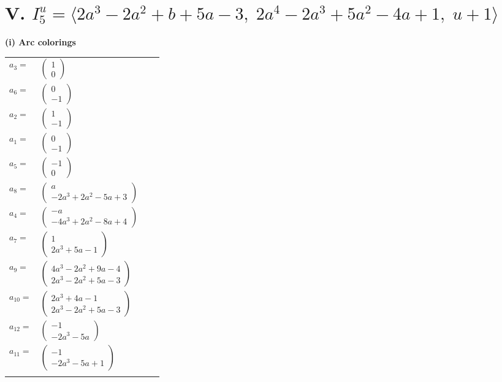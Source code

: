 \documentclass[1p]{elsarticle_modified}
\theoremstyle{definition}
\begin{document}
\centering \section*{V. $I^u_{5}= \langle 2 a^3-2 a^2+b+5 a-3,\;2 a^4-2 a^3+5 a^2-4 a+1,\;u+1 \rangle$}
\flushleft \textbf{(i) Arc colorings}\\
\begin{tabular}{m{7pt} m{180pt} m{7pt} m{180pt} }
\flushright $a_{3}=$&$\begin{pmatrix}1\\0\end{pmatrix}$ \\
\flushright $a_{6}=$&$\begin{pmatrix}0\\-1\end{pmatrix}$ \\
\flushright $a_{2}=$&$\begin{pmatrix}1\\-1\end{pmatrix}$ \\
\flushright $a_{1}=$&$\begin{pmatrix}0\\-1\end{pmatrix}$ \\
\flushright $a_{5}=$&$\begin{pmatrix}-1\\0\end{pmatrix}$ \\
\flushright $a_{8}=$&$\begin{pmatrix}a\\-2 a^3+2 a^2-5 a+3\end{pmatrix}$ \\
\flushright $a_{4}=$&$\begin{pmatrix}- a\\-4 a^3+2 a^2-8 a+4\end{pmatrix}$ \\
\flushright $a_{7}=$&$\begin{pmatrix}1\\2 a^3+5 a-1\end{pmatrix}$ \\
\flushright $a_{9}=$&$\begin{pmatrix}4 a^3-2 a^2+9 a-4\\2 a^3-2 a^2+5 a-3\end{pmatrix}$ \\
\flushright $a_{10}=$&$\begin{pmatrix}2 a^3+4 a-1\\2 a^3-2 a^2+5 a-3\end{pmatrix}$ \\
\flushright $a_{12}=$&$\begin{pmatrix}-1\\-2 a^3-5 a\end{pmatrix}$ \\
\flushright $a_{11}=$&$\begin{pmatrix}-1\\-2 a^3-5 a+1\end{pmatrix}$\\&\end{tabular}
\end{document}
